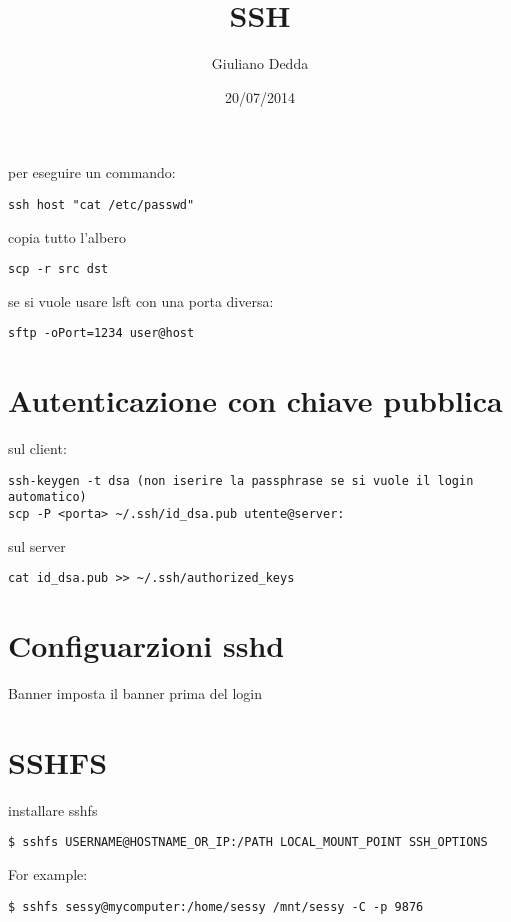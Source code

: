 \documentclass[]{article}
\title{SSH}
\author{Giuliano Dedda}
\date{20/07/2014}
\begin{document}
\maketitle

per eseguire un commando:

\begin{verbatim}
ssh host "cat /etc/passwd" 
\end{verbatim}

copia tutto l'albero

\begin{verbatim}
scp -r src dst
\end{verbatim}

se si vuole usare lsft con una porta diversa:

\begin{verbatim}
sftp -oPort=1234 user@host
\end{verbatim}

\section{Autenticazione con chiave
pubblica}\label{autenticazione-con-chiave-pubblica}

sul client:

\begin{verbatim}
ssh-keygen -t dsa (non iserire la passphrase se si vuole il login automatico)
scp -P <porta> ~/.ssh/id_dsa.pub utente@server:
\end{verbatim}

sul server

\begin{verbatim}
cat id_dsa.pub >> ~/.ssh/authorized_keys
\end{verbatim}

\section{Configuarzioni sshd}\label{configuarzioni-sshd}

Banner imposta il banner prima del login

\section{SSHFS}\label{sshfs}

installare sshfs

\begin{verbatim}
$ sshfs USERNAME@HOSTNAME_OR_IP:/PATH LOCAL_MOUNT_POINT SSH_OPTIONS
\end{verbatim}

For example:

\begin{verbatim}
$ sshfs sessy@mycomputer:/home/sessy /mnt/sessy -C -p 9876
\end{verbatim}
\end{document}

